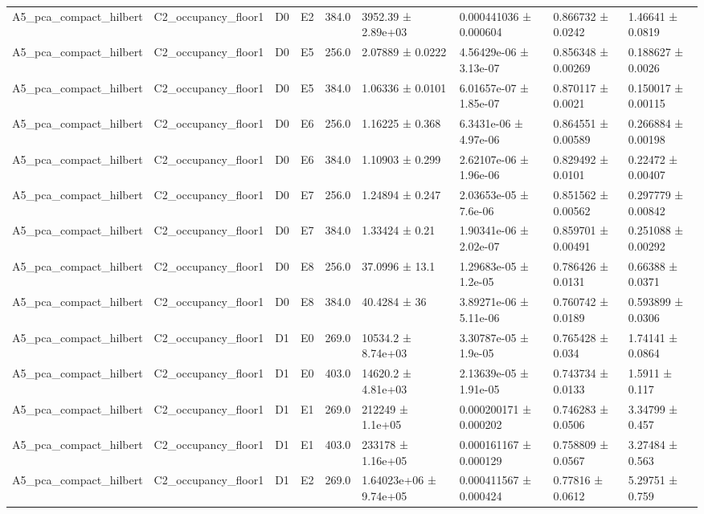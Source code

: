 \begin{table}
\begin{tabular}{lllllllll}
A5\_pca\_compact\_hilbert & C2\_occupancy\_floor1 & D0 & E2 & 384.0 & 3952.39 ± 2.89e+03 & 0.000441036 ± 0.000604 & 0.866732 ± 0.0242 & 1.46641 ± 0.0819 \\
A5\_pca\_compact\_hilbert & C2\_occupancy\_floor1 & D0 & E5 & 256.0 & 2.07889 ± 0.0222 & 4.56429e-06 ± 3.13e-07 & 0.856348 ± 0.00269 & 0.188627 ± 0.0026 \\
A5\_pca\_compact\_hilbert & C2\_occupancy\_floor1 & D0 & E5 & 384.0 & 1.06336 ± 0.0101 & 6.01657e-07 ± 1.85e-07 & 0.870117 ± 0.0021 & 0.150017 ± 0.00115 \\
A5\_pca\_compact\_hilbert & C2\_occupancy\_floor1 & D0 & E6 & 256.0 & 1.16225 ± 0.368 & 6.3431e-06 ± 4.97e-06 & 0.864551 ± 0.00589 & 0.266884 ± 0.00198 \\
A5\_pca\_compact\_hilbert & C2\_occupancy\_floor1 & D0 & E6 & 384.0 & 1.10903 ± 0.299 & 2.62107e-06 ± 1.96e-06 & 0.829492 ± 0.0101 & 0.22472 ± 0.00407 \\
A5\_pca\_compact\_hilbert & C2\_occupancy\_floor1 & D0 & E7 & 256.0 & 1.24894 ± 0.247 & 2.03653e-05 ± 7.6e-06 & 0.851562 ± 0.00562 & 0.297779 ± 0.00842 \\
A5\_pca\_compact\_hilbert & C2\_occupancy\_floor1 & D0 & E7 & 384.0 & 1.33424 ± 0.21 & 1.90341e-06 ± 2.02e-07 & 0.859701 ± 0.00491 & 0.251088 ± 0.00292 \\
A5\_pca\_compact\_hilbert & C2\_occupancy\_floor1 & D0 & E8 & 256.0 & 37.0996 ± 13.1 & 1.29683e-05 ± 1.2e-05 & 0.786426 ± 0.0131 & 0.66388 ± 0.0371 \\
A5\_pca\_compact\_hilbert & C2\_occupancy\_floor1 & D0 & E8 & 384.0 & 40.4284 ± 36 & 3.89271e-06 ± 5.11e-06 & 0.760742 ± 0.0189 & 0.593899 ± 0.0306 \\
A5\_pca\_compact\_hilbert & C2\_occupancy\_floor1 & D1 & E0 & 269.0 & 10534.2 ± 8.74e+03 & 3.30787e-05 ± 1.9e-05 & 0.765428 ± 0.034 & 1.74141 ± 0.0864 \\
A5\_pca\_compact\_hilbert & C2\_occupancy\_floor1 & D1 & E0 & 403.0 & 14620.2 ± 4.81e+03 & 2.13639e-05 ± 1.91e-05 & 0.743734 ± 0.0133 & 1.5911 ± 0.117 \\
A5\_pca\_compact\_hilbert & C2\_occupancy\_floor1 & D1 & E1 & 269.0 & 212249 ± 1.1e+05 & 0.000200171 ± 0.000202 & 0.746283 ± 0.0506 & 3.34799 ± 0.457 \\
A5\_pca\_compact\_hilbert & C2\_occupancy\_floor1 & D1 & E1 & 403.0 & 233178 ± 1.16e+05 & 0.000161167 ± 0.000129 & 0.758809 ± 0.0567 & 3.27484 ± 0.563 \\
A5\_pca\_compact\_hilbert & C2\_occupancy\_floor1 & D1 & E2 & 269.0 & 1.64023e+06 ± 9.74e+05 & 0.000411567 ± 0.000424 & 0.77816 ± 0.0612 & 5.29751 ± 0.759 \\

\end{tabular}
\end{table}
